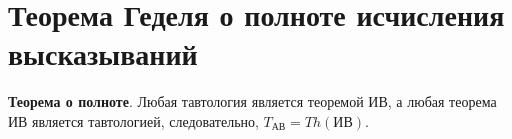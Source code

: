 \section{Теорема Геделя о полноте исчисления высказываний}
\textbf{Теорема о полноте}. Любая тавтология является теоремой ИВ, а любая теорема ИВ является тавтологией, следовательно, $T_{\text{АВ}} = Th(\text{ИВ})$.